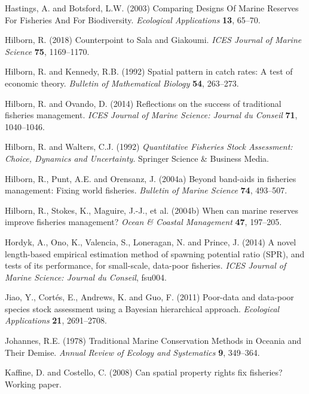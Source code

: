 \documentclass[twoside,12pt,final]{ucthesis-CA2012}
\begin{document}
\begin{ucmainmatter}
\hypertarget{ref-Hastings2003}{}
Hastings, A. and Botsford, L.W. (2003) Comparing Designs Of Marine
Reserves For Fisheries And For Biodiversity. \emph{Ecological
Applications} \textbf{13}, 65--70.

\hypertarget{ref-Hilborn2018}{}
Hilborn, R. (2018) Counterpoint to Sala and Giakoumi. \emph{ICES Journal
of Marine Science} \textbf{75}, 1169--1170.

\hypertarget{ref-Hilborn1992a}{}
Hilborn, R. and Kennedy, R.B. (1992) Spatial pattern in catch rates: A
test of economic theory. \emph{Bulletin of Mathematical Biology}
\textbf{54}, 263--273.

\hypertarget{ref-Hilborn2014b}{}
Hilborn, R. and Ovando, D. (2014) Reflections on the success of
traditional fisheries management. \emph{ICES Journal of Marine Science:
Journal du Conseil} \textbf{71}, 1040--1046.

\hypertarget{ref-Hilborn1992}{}
Hilborn, R. and Walters, C.J. (1992) \emph{Quantitative Fisheries Stock
Assessment: Choice, Dynamics and Uncertainty}. Springer Science \&
Business Media.

\hypertarget{ref-Hilborn2004a}{}
Hilborn, R., Punt, A.E. and Orensanz, J. (2004a) Beyond band-aids in
fisheries management: Fixing world fisheries. \emph{Bulletin of Marine
Science} \textbf{74}, 493--507.

\hypertarget{ref-Hilborn2004}{}
Hilborn, R., Stokes, K., Maguire, J.-J., et al. (2004b) When can marine
reserves improve fisheries management? \emph{Ocean \& Coastal
Management} \textbf{47}, 197--205.

\hypertarget{ref-Hordyk2014}{}
Hordyk, A., Ono, K., Valencia, S., Loneragan, N. and Prince, J. (2014) A
novel length-based empirical estimation method of spawning potential
ratio (SPR), and tests of its performance, for small-scale, data-poor
fisheries. \emph{ICES Journal of Marine Science: Journal du Conseil},
fsu004.

\hypertarget{ref-Jiao2011}{}
Jiao, Y., Cortés, E., Andrews, K. and Guo, F. (2011) Poor-data and
data-poor species stock assessment using a Bayesian hierarchical
approach. \emph{Ecological Applications} \textbf{21}, 2691--2708.

\hypertarget{ref-Johannes1978}{}
Johannes, R.E. (1978) Traditional Marine Conservation Methods in Oceania
and Their Demise. \emph{Annual Review of Ecology and Systematics}
\textbf{9}, 349--364.

\hypertarget{ref-Kaffine2008}{}
Kaffine, D. and Costello, C. (2008) Can spatial property rights fix
fisheries? Working paper.


\end{ucmainmatter}
\end{document}
